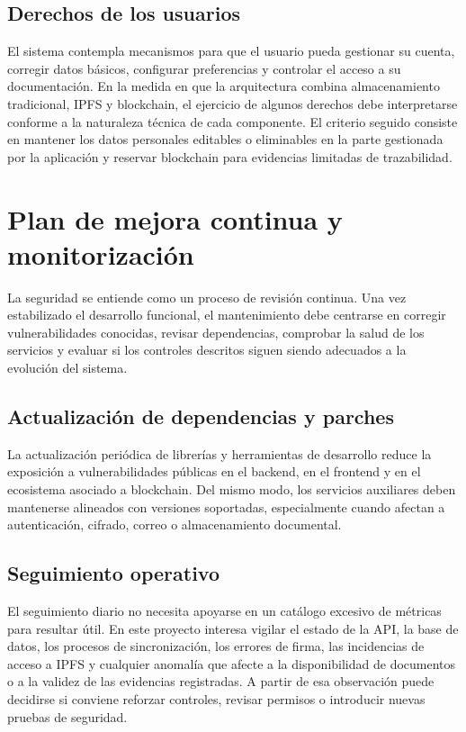 \documentclass[11pt, a4paper]{article}
\begin{document}
\subsection{Derechos de los usuarios}

El sistema contempla mecanismos para que el usuario pueda gestionar su cuenta, corregir datos básicos, configurar preferencias y controlar el acceso a su documentación. En la medida en que la arquitectura combina almacenamiento tradicional, IPFS y blockchain, el ejercicio de algunos derechos debe interpretarse conforme a la naturaleza técnica de cada componente. El criterio seguido consiste en mantener los datos personales editables o eliminables en la parte gestionada por la aplicación y reservar blockchain para evidencias limitadas de trazabilidad.

\section{Plan de mejora continua y monitorización}

La seguridad se entiende como un proceso de revisión continua. Una vez estabilizado el desarrollo funcional, el mantenimiento debe centrarse en corregir vulnerabilidades conocidas, revisar dependencias, comprobar la salud de los servicios y evaluar si los controles descritos siguen siendo adecuados a la evolución del sistema.

\subsection{Actualización de dependencias y parches}

La actualización periódica de librerías y herramientas de desarrollo reduce la exposición a vulnerabilidades públicas en el backend, en el frontend y en el ecosistema asociado a blockchain. Del mismo modo, los servicios auxiliares deben mantenerse alineados con versiones soportadas, especialmente cuando afectan a autenticación, cifrado, correo o almacenamiento documental.

\subsection{Seguimiento operativo}

El seguimiento diario no necesita apoyarse en un catálogo excesivo de métricas para resultar útil. En este proyecto interesa vigilar el estado de la API, la base de datos, los procesos de sincronización, los errores de firma, las incidencias de acceso a IPFS y cualquier anomalía que afecte a la disponibilidad de documentos o a la validez de las evidencias registradas. A partir de esa observación puede decidirse si conviene reforzar controles, revisar permisos o introducir nuevas pruebas de seguridad.
\end{document}
